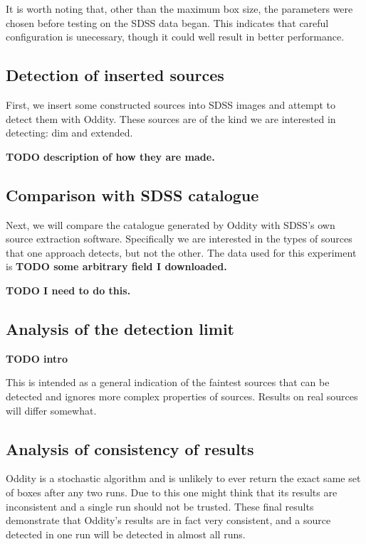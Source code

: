 \documentclass[manuscript]{aastex}
\newcommand{\TODO}[1]{\textbf{TODO #1}}
\begin{document}
It is worth noting that, other than the maximum box size, the parameters were chosen before testing on the SDSS data began. This indicates that careful configuration is unecessary, though it could well result in better performance.

\subsection{Detection of inserted sources}

First, we insert some constructed sources into SDSS images and attempt to detect them with Oddity. These sources are of the kind we are interested in detecting: dim and extended. 

\TODO{description of how they are made.}

\subsection{Comparison with SDSS catalogue}

Next, we will compare the catalogue generated by Oddity with SDSS's own source extraction software. Specifically we are interested in the types of sources that one approach detects, but not the other. The data used for this experiment is \TODO{some arbitrary field I downloaded.}

\TODO{I need to do this.}

\subsection{Analysis of the detection limit}

\TODO{intro}

This is intended as a general indication of the faintest sources that can be detected and ignores more complex properties of sources. Results on real sources will differ somewhat.


\subsection{Analysis of consistency of results}

Oddity is a stochastic algorithm and is unlikely to ever return the exact same set of boxes after any two runs. Due to this one might think that its results are inconsistent and a single run should not be trusted. These final results demonstrate that Oddity's results are in fact very consistent, and a source detected in one run will be detected in almost all runs.
\end{document}
